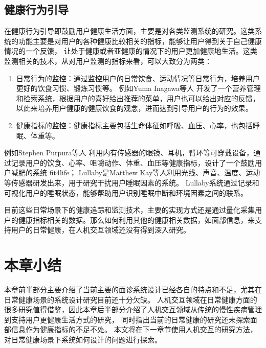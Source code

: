 \subsection{健康行为引导}
在健康行为引导即鼓励用户健康生活方面，主要是对各类监测系统的研究。这类系统的功能主要是对用户的各种健康比较相关的指标，能够让用户得到关于自己健康情况的一个反馈，
让处于健康或者亚健康的情况下的用户更加健康地生活。这类监测相关的技术，从对用户监测的指标来看，可以大致分为两类：
\begin{enumerate}

    \item 日常行为的监控：通过监控用户的日常饮食、运动情况等日常行为，培养用户更好的饮食习惯、锻炼习惯等\cite{purpura2011fit4life, Inagawa2013A,bravata2007using,cordeiro2015barriers,lin2006fish, miller2014stepstream}。 例如Yuma Inagawa等人\cite{Inagawa2013A} 开发了一个营养管理和检索系统，根据用户的喜好给出推荐的菜单，用户也可以给出对应的反馈，以此来培养用户健康的健康饮食的观念，进而达到引导用户的行为的效果。

    \item 健康指标的监控：健康指标主要包括生命体征如呼吸、血压、心率，也包括睡眠、体重等\cite{kay2012lullaby, gronvall2013beyond}。
    
\end{enumerate}

例如Stephen Purpura等人\cite{purpura2011fit4life} 利用内有传感器的眼镜、耳机，臂环等可穿戴设备，通过记录用户的饮食、心率、咀嚼动作、体重、血压等健康指标，设计了一个鼓励用户减肥的系统 fit4life； 
Lullaby\cite{kay2012lullaby}是Matthew Kay等人利用光线、声音、温度、运动等传感器研发出来，用于研究干扰用户睡眠因素的系统。
Lullaby系统通过记录和可视化用户的睡眠状态，能够帮助用户识别睡眠中断和环境因素之间的联系。 


目前这些日常场景下的健康追踪和监测技术，主要的实现方式还是通过量化采集用户的健康指标相关的数据。那么如何利用其他的健康相关数据，如面部信息，来支持用户的日常健康，在人机交互领域还没有得到深入研究。



\section{本章小结}
本章前半部分主要介绍了当前主要的面诊系统设计已经各自的特点和不足，尤其在日常健康场景的系统设计研究目前还十分欠缺。
人机交互领域在日常健康方面的很多研究值得借鉴，因此本章后半部分介绍了人机交互领域从传统的慢性疾病管理到支持用户更健康生活方式的研究，
同时指出当前的日常健康的研究还未探索面部信息作为健康指标的不足不处。
本文将在下一章节使用人机交互的研究方法，对日常健康场景下系统如何设计的问题进行探索。